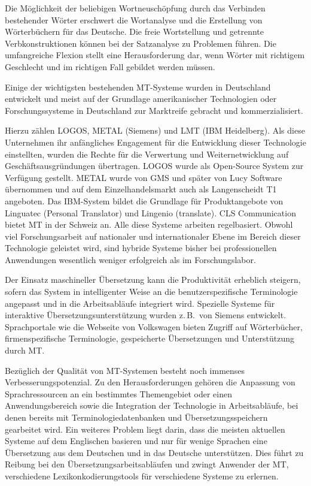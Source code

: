 \begin{multicols}{2}
Die Möglichkeit der beliebigen Wortneuschöpfung durch das Verbinden bestehender Wörter erschwert die Wortanalyse und die Erstellung von Wörterbüchern für das Deutsche. Die freie Wortstellung und getrennte Verbkonstruktionen können bei der Satzanalyse zu Problemen führen. Die umfangreiche Flexion stellt eine Herausforderung dar, wenn Wörter mit richtigem Geschlecht und im richtigen Fall gebildet werden müssen. 


Einige der wichtigsten bestehenden MT-Systeme wurden in Deutschland entwickelt und 
meist auf der Grundlage amerikanischer Technologien oder Forschungssysteme in Deutschland zur Marktreife gebracht und kommerzialisiert. 

Hierzu zählen LOGOS, METAL (Siemens) und LMT (IBM Heidelberg). Als diese Unternehmen ihr anfängliches Engagement für die Entwicklung dieser Technologie einstellten, 
wurden die Rechte für die Verwertung und Weiternetwicklung 
auf Geschäftsausgründungen übertragen. 
LOGOS wurde als Open-Source System zur Verfügung gestellt. METAL wurde von GMS und später von Lucy Software übernommen und auf dem Einzelhandelsmarkt auch als Langenscheidt T1 angeboten. Das IBM-System bildet die Grundlage für Produktangebote von Linguatec (Personal Translator) und Lingenio (translate). CLS Communication bietet MT in der Schweiz an. Alle diese Systeme arbeiten regelbasiert. Obwohl viel Forschungsarbeit auf nationaler und internationaler Ebene im Bereich dieser Technologie geleistet wird, sind hybride Systeme bisher bei professionellen Anwendungen wesentlich weniger erfolgreich als im Forschungslabor. 

Der Einsatz maschineller Übersetzung kann die Produktivität erheblich steigern, sofern das System in intelligenter Weise an die benutzerspezifische Terminologie angepasst und in die Arbeitsabläufe integriert wird. Spezielle Systeme für interaktive Übersetzungsunterstützung wurden z.\,B.~von Siemens entwickelt. Sprachportale wie die Webseite von Volkswagen bieten Zugriff auf Wörterbücher, firmenspezifische Terminologie, gespeicherte Übersetzungen und Unterstützung durch MT.

Bezüglich der Qualität von MT-Systemen besteht noch immenses Verbesserungspotenzial. Zu den Herausforderungen gehören die Anpassung von Sprachressourcen an ein bestimmtes Themengebiet oder einen Anwendungsbereich sowie die Integration der Technologie in Arbeitsabläufe, bei denen bereits mit Terminologiedatenbanken und Übersetzungsspeichern gearbeitet wird. Ein weiteres Problem liegt darin, dass die meisten aktuellen Systeme auf dem Englischen basieren und nur für wenige Sprachen eine Übersetzung aus dem Deutschen und in das Deutsche unterstützen. Dies führt zu Reibung bei den Übersetzungsarbeitsabläufen und zwingt Anwender der MT, verschiedene Lexikonkodierungstools für verschiedene Systeme zu erlernen.


\end{multicols}

